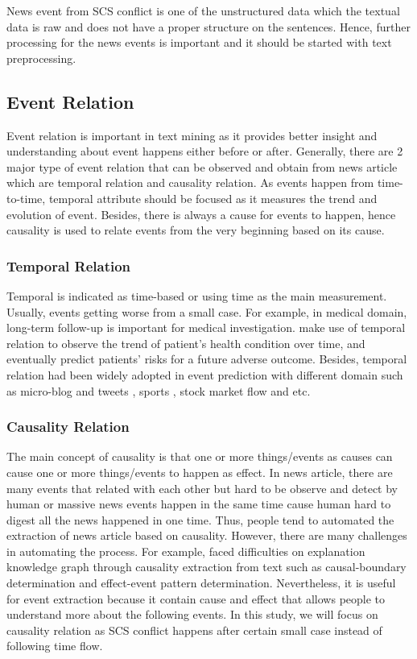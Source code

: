 \documentclass[twoside]{utmthesis}
\begin{document}
News event from SCS conflict is one of the unstructured data which the textual data is raw and does not have a proper structure on the sentences. Hence, further processing for the news events is important and it should be started with text preprocessing. 

\subsection{Event Relation}
Event relation is important in text mining as it provides better insight and understanding about event happens either before or after. Generally, there are 2 major type of event relation that can be observed and obtain from news article which are temporal relation and causality relation. As events happen from time-to-time, temporal attribute should be focused as it measures the trend and evolution of event. Besides, there is always a cause for events to happen, hence causality is used to relate events from the very beginning based on its cause.

\subsubsection{Temporal Relation}
Temporal is indicated as time-based or using time as the main measurement. Usually, events getting worse from a small case. For example, in medical domain, long-term follow-up is important for medical investigation. \cite{maziarz2017longitudinal} make use of temporal relation to observe the trend of patient's health condition over time, and eventually predict patients' risks for a future adverse outcome. Besides, temporal relation had been widely adopted in event prediction with different domain such as micro-blog and tweets \citep{preethi2015temporal}, sports \citep{grolinger2016energy}, stock market flow \citep{ding2015deep} and etc. 

\subsubsection{Causality Relation}
The main concept of causality is that one or more things/events as causes can cause one or more things/events to happen as effect. In news article, there are many events that related with each other but hard to be observe and detect by human or massive news events happen in the same time cause human hard to digest all the news happened in one time. Thus, people tend to automated the extraction of news article based on causality. However, there are many challenges in automating the process. For example, \cite{pechsiri2010explanation} faced difficulties on explanation knowledge graph through causality extraction from text such as causal-boundary determination and effect-event pattern determination. Nevertheless, it is useful for event extraction because it contain cause and effect that allows people to understand more about the following events. In this study, we will focus on causality relation as SCS conflict happens after certain small case instead of following time flow.  
\end{document}
